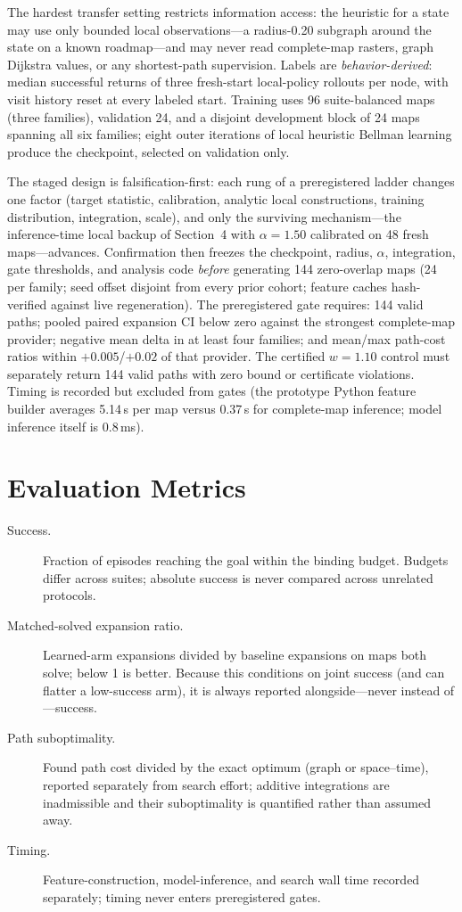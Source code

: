 \documentclass[11pt,letterpaper]{article}
\begin{document}
The hardest transfer setting restricts information access: the heuristic for a state may use only bounded local observations---a radius-0.20 subgraph around the state on a known roadmap---and may never read complete-map rasters, graph Dijkstra values, or any shortest-path supervision. Labels are \emph{behavior-derived}: median successful returns of three fresh-start local-policy rollouts per node, with visit history reset at every labeled start. Training uses 96 suite-balanced maps (three families), validation 24, and a disjoint development block of 24 maps spanning all six families; eight outer iterations of local heuristic Bellman learning produce the checkpoint, selected on validation only.

The staged design is falsification-first: each rung of a preregistered ladder changes one factor (target statistic, calibration, analytic local constructions, training distribution, integration, scale), and only the surviving mechanism---the inference-time local backup of Section~4 with $\alpha{=}1.50$ calibrated on 48 fresh maps---advances. Confirmation then freezes the checkpoint, radius, $\alpha$, integration, gate thresholds, and analysis code \emph{before} generating 144 zero-overlap maps (24 per family; seed offset disjoint from every prior cohort; feature caches hash-verified against live regeneration). The preregistered gate requires: 144 valid paths; pooled paired expansion CI below zero against the strongest complete-map provider; negative mean delta in at least four families; and mean/max path-cost ratios within $+0.005$/$+0.02$ of that provider. The certified $w{=}1.10$ control must separately return 144 valid paths with zero bound or certificate violations. Timing is recorded but excluded from gates (the prototype Python feature builder averages 5.14\,s per map versus 0.37\,s for complete-map inference; model inference itself is 0.8\,ms).

\section{Evaluation Metrics}

\begin{description}
  \item[Success.] Fraction of episodes reaching the goal within the binding budget. Budgets differ across suites; absolute success is never compared across unrelated protocols.
  \item[Matched-solved expansion ratio.] Learned-arm expansions divided by baseline expansions on maps both solve; below 1 is better. Because this conditions on joint success (and can flatter a low-success arm), it is always reported alongside---never instead of---success.
  \item[Path suboptimality.] Found path cost divided by the exact optimum (graph or space--time), reported separately from search effort; additive integrations are inadmissible and their suboptimality is quantified rather than assumed away.
  \item[Timing.] Feature-construction, model-inference, and search wall time recorded separately; timing never enters preregistered gates.
\end{description}
\end{document}
